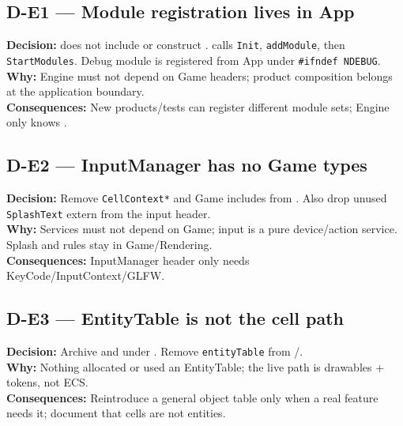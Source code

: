\subsection*{D-E1 --- Module registration lives in App}
\begin{decisionbox}[title={D-E1 \quad 2026-07-28}]
\textbf{Decision:}  does not include or construct
.  calls \texttt{Init},
\texttt{addModule}, then \texttt{StartModules}. Debug module is registered
from App under \texttt{\#ifndef NDEBUG}.\\
\textbf{Why:} Engine must not depend on Game headers; product composition
belongs at the application boundary.\\
\textbf{Consequences:} New products/tests can register different module sets;
Engine only knows .
\end{decisionbox}

\subsection*{D-E2 --- InputManager has no Game types}
\begin{decisionbox}[title={D-E2 \quad 2026-07-28}]
\textbf{Decision:} Remove \texttt{CellContext*} and Game includes from
. Also drop unused \texttt{SplashText} extern from the
input header.\\
\textbf{Why:} Services must not depend on Game; input is a pure device/action
service. Splash and rules stay in Game/Rendering.\\
\textbf{Consequences:} InputManager header only needs KeyCode/InputContext/GLFW.
\end{decisionbox}

\subsection*{D-E3 --- EntityTable is not the cell path}
\begin{decisionbox}[title={D-E3 \quad 2026-07-28}]
\textbf{Decision:} Archive  and 
under . Remove \texttt{entityTable} from
/.\\
\textbf{Why:} Nothing allocated or used an EntityTable; the live path is
drawables + tokens, not ECS.\\
\textbf{Consequences:} Reintroduce a general object table only when a real
feature needs it; document that cells are not entities.
\end{decisionbox}

